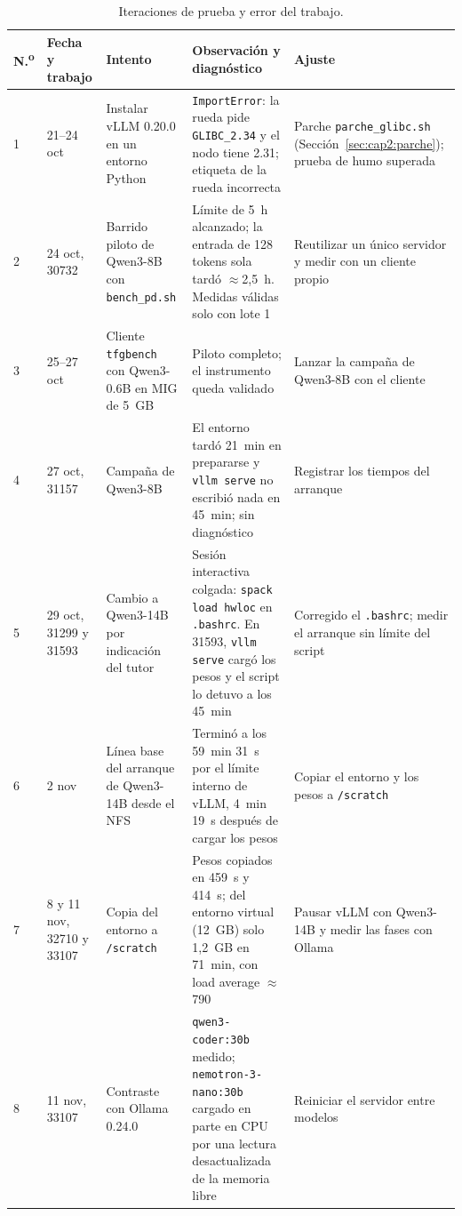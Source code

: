 \begin{table}[htbp]
  \centering
  \caption{Iteraciones de prueba y error del trabajo.}
  \label{tab:cap2:iteraciones}
  \scriptsize
  \begin{tabular}{|p{}|p{}|p{}|p{}|p{}|}
    \hline
    \textbf{N.\textsuperscript{o}} & \textbf{Fecha y trabajo} & \textbf{Intento} & \textbf{Observación y diagnóstico} & \textbf{Ajuste} \\
    \hline
    1 & 21--24 oct & Instalar vLLM 0.20.0 en un entorno Python & \texttt{ImportError}: la rueda pide \texttt{GLIBC\_2.34} y el nodo tiene 2.31; etiqueta de la rueda incorrecta & Parche \texttt{parche\_glibc.sh} (Sección~\ref{sec:cap2:parche}); prueba de humo superada \\
    \hline
    2 & 24 oct, 30732 & Barrido piloto de Qwen3-8B con \texttt{bench\_pd.sh} & Límite de 5~h alcanzado; la entrada de 128 tokens sola tardó $\approx$2,5~h. Medidas válidas solo con lote 1 & Reutilizar un único servidor y medir con un cliente propio \\
    \hline
    3 & 25--27 oct & Cliente \texttt{tfgbench} con Qwen3-0.6B en MIG de 5~GB & Piloto completo; el instrumento queda validado & Lanzar la campaña de Qwen3-8B con el cliente \\
    \hline
    4 & 27 oct, 31157 & Campaña de Qwen3-8B & El entorno tardó 21~min en prepararse y \texttt{vllm serve} no escribió nada en 45~min; sin diagnóstico & Registrar los tiempos del arranque \\
    \hline
    5 & 29 oct, 31299 y 31593 & Cambio a Qwen3-14B por indicación del tutor & Sesión interactiva colgada: \texttt{spack load hwloc} en \texttt{.bashrc}. En 31593, \texttt{vllm serve} cargó los pesos y el script lo detuvo a los 45~min & Corregido el \texttt{.bashrc}; medir el arranque sin límite del script \\
    \hline
    6 & 2 nov & Línea base del arranque de Qwen3-14B desde el NFS & Terminó a los 59~min 31~s por el límite interno de vLLM, 4~min 19~s después de cargar los pesos & Copiar el entorno y los pesos a \texttt{/scratch} \\
    \hline
    7 & 8 y 11 nov, 32710 y 33107 & Copia del entorno a \texttt{/scratch} & Pesos copiados en 459~s y 414~s; del entorno virtual (12~GB) solo 1,2~GB en 71~min, con load average $\approx$790 & Pausar vLLM con Qwen3-14B y medir las fases con Ollama \\
    \hline
    8 & 11 nov, 33107 & Contraste con Ollama 0.24.0 & \texttt{qwen3-coder:30b} medido; \texttt{nemotron-3-nano:30b} cargado en parte en CPU por una lectura desactualizada de la memoria libre & Reiniciar el servidor entre modelos \\

\end{tabular}
\end{table}
